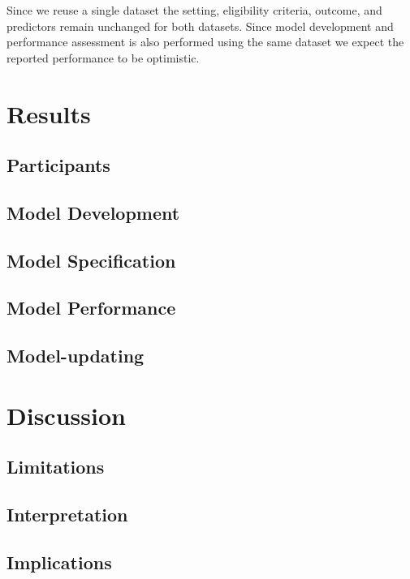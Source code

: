 \documentclass[]{article}
\begin{document}
Since we reuse a single dataset the setting, eligibility criteria, outcome, and predictors remain unchanged for both datasets. Since model development and performance assessment is also performed using the same dataset we expect the reported performance to be optimistic. 

\section{Results}
\subsection{Participants} %

\subsection{Model Development} %

\subsection{Model Specification} %

\subsection{Model Performance} %

\subsection{Model-updating} %


\section{Discussion}
\subsection{Limitations} %

\subsection{Interpretation} %

\subsection{Implications} %
\end{document}
